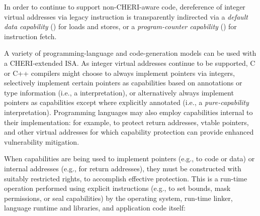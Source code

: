 In order to continue to support non-CHERI-aware code, dereference of integer
virtual addresses via legacy instruction is transparently indirected via a
\textit{default data capability} (\DDC{}) for loads and stores, or a
\textit{program-counter capability} (\PCC{}) for instruction fetch.

A variety of programming-language and code-generation models can be used with
a CHERI-extended ISA.
As integer virtual addresses continue to be supported, C or C++ compilers
might choose to always implement pointers via integers, selectively implement
certain pointers as capabilities based on annotations or type information
(i.e., a  interpretation), or
alternatively
always implement pointers as
capabilities except where explicitly annotated (i.e., a
\textit{pure-capability} interpretation).
Programming languages may also employ capabilities internal to their
implementation: for example, to protect return addresses, vtable pointers, and
other virtual addresses for which capability protection can provide enhanced
vulnerability mitigation.

When capabilities are being used to implement pointers (e.g., to code or data)
or internal addresses (e.g., for return addresses), they must be
constructed with suitably restricted rights, to accomplish effective protection.
This is a run-time operation performed using explicit instructions (e.g., to
set bounds, mask permissions, or seal capabilities) by the operating system,
run-time linker, language runtime and libraries, and application code itself:

